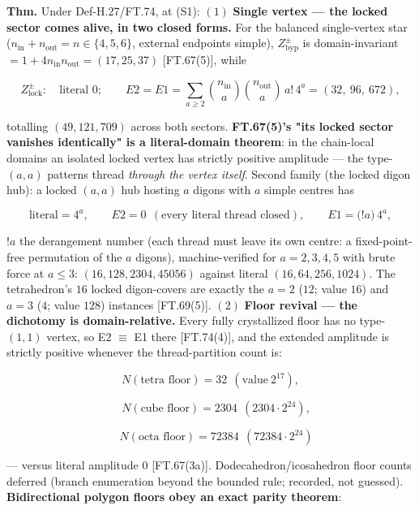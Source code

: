 \begin{theorem}\label{tag:FT-75}
\textbf{Thm.} Under Def-H.27/FT.74, at (S1): $(1)$ \textbf{Single vertex — the locked sector comes alive, in two closed forms.} For the balanced single-vertex star ($n_{\mathrm{in}}+n_{\mathrm{out}}=n\in\{4,5,6\}$, external endpoints simple), $Z^{\pm}_{\mathrm{byp}}$ is domain-invariant $=1+4n_{\mathrm{in}}n_{\mathrm{out}}=(17,25,37)$ [FT.67(5)], while

\[
Z^{\pm}_{\mathrm{lock}}:\quad\text{literal }0;\qquad E2=E1=\sum_{a\ge2}\binom{n_{\mathrm{in}}}a\binom{n_{\mathrm{out}}}a\,a!\,4^{a}=(32,\ 96,\ 672),
\]

totalling $(49,121,709)$ across both sectors. \textbf{FT.67(5)'s "its locked sector vanishes identically" is a literal-domain theorem}: in the chain-local domains an isolated locked vertex has strictly positive amplitude — the type-$(a,a)$ patterns thread \textit{through the vertex itself}. Second family (the locked digon hub): a locked $(a,a)$ hub hosting $a$ digons with $a$ simple centres has

\[
\text{literal}=4^{a},\qquad E2=0\ \ (\text{every literal thread closed}),\qquad E1=\bigl(!a\bigr)\,4^{a},
\]

$!a$ the derangement number (each thread must leave its own centre: a fixed-point-free permutation of the $a$ digons), machine-verified for $a=2,3,4,5$ with brute force at $a\le3$: $(16,128,2304,45056)$ against literal $(16,64,256,1024)$. The tetrahedron's $16$ locked digon-covers are exactly the $a=2$ ($12$; value $16$) and $a=3$ ($4$; value $128$) instances [FT.69(5)]. $(2)$ \textbf{Floor revival — the dichotomy is domain-relative.} Every fully crystallized floor has no type-$(1,1)$ vertex, so E2 $\equiv$ E1 there [FT.74(4)], and the extended amplitude is strictly positive whenever the thread-partition count is:

\[
N(\text{tetra floor})=32\ \ (\text{value}\ 2^{17}),
\]

\[
\quad N(\text{cube floor})=2304\ \ (2304\cdot2^{24}),
\]

\[
\quad N(\text{octa floor})=72384\ \ (72384\cdot2^{24})
\]

— versus literal amplitude $0$ [FT.67(3a)]. Dodecahedron/icosahedron floor counts deferred (branch enumeration beyond the bounded rule; recorded, not guessed). \textbf{Bidirectional polygon floors obey an exact parity theorem}:


\end{theorem}
